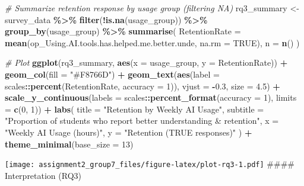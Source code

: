 \documentclass[
]{article}
\newenvironment{Shaded}{\begin{snugshade}}{\end{snugshade}}
\newcommand{\AttributeTok}[1]{\textcolor[rgb]{0.13,0.29,0.53}{#1}}
\newcommand{\CommentTok}[1]{\textcolor[rgb]{0.56,0.35,0.01}{\textit{#1}}}
\newcommand{\ConstantTok}[1]{\textcolor[rgb]{0.56,0.35,0.01}{#1}}
\newcommand{\DecValTok}[1]{\textcolor[rgb]{0.00,0.00,0.81}{#1}}
\newcommand{\FloatTok}[1]{\textcolor[rgb]{0.00,0.00,0.81}{#1}}
\newcommand{\FunctionTok}[1]{\textcolor[rgb]{0.13,0.29,0.53}{\textbf{#1}}}
\newcommand{\NormalTok}[1]{#1}
\newcommand{\OtherTok}[1]{\textcolor[rgb]{0.56,0.35,0.01}{#1}}
\newcommand{\SpecialCharTok}[1]{\textcolor[rgb]{0.81,0.36,0.00}{\textbf{#1}}}
\newcommand{\StringTok}[1]{\textcolor[rgb]{0.31,0.60,0.02}{#1}}
\begin{document}
\begin{Shaded}
\begin{Highlighting}[]
\CommentTok{\# Summarize retention response by usage group (filtering NA)}
\NormalTok{rq3\_summary }\OtherTok{\textless{}{-}}\NormalTok{ survey\_data }\SpecialCharTok{\%\textgreater{}\%}
  \FunctionTok{filter}\NormalTok{(}\SpecialCharTok{!}\FunctionTok{is.na}\NormalTok{(usage\_group)) }\SpecialCharTok{\%\textgreater{}\%}
  \FunctionTok{group\_by}\NormalTok{(usage\_group) }\SpecialCharTok{\%\textgreater{}\%}
  \FunctionTok{summarise}\NormalTok{(}
    \AttributeTok{RetentionRate =} \FunctionTok{mean}\NormalTok{(op\_Using.AI.tools.has.helped.me.better.unde, }\AttributeTok{na.rm =} \ConstantTok{TRUE}\NormalTok{),}
    \AttributeTok{n =} \FunctionTok{n}\NormalTok{()}
\NormalTok{  )}

\CommentTok{\# Plot}
\FunctionTok{ggplot}\NormalTok{(rq3\_summary, }\FunctionTok{aes}\NormalTok{(}\AttributeTok{x =}\NormalTok{ usage\_group, }\AttributeTok{y =}\NormalTok{ RetentionRate)) }\SpecialCharTok{+}
  \FunctionTok{geom\_col}\NormalTok{(}\AttributeTok{fill =} \StringTok{"\#F8766D"}\NormalTok{) }\SpecialCharTok{+}
  \FunctionTok{geom\_text}\NormalTok{(}\FunctionTok{aes}\NormalTok{(}\AttributeTok{label =}\NormalTok{ scales}\SpecialCharTok{::}\FunctionTok{percent}\NormalTok{(RetentionRate, }\AttributeTok{accuracy =} \DecValTok{1}\NormalTok{)), }\AttributeTok{vjust =} \SpecialCharTok{{-}}\FloatTok{0.3}\NormalTok{, }\AttributeTok{size =} \FloatTok{4.5}\NormalTok{) }\SpecialCharTok{+}
  \FunctionTok{scale\_y\_continuous}\NormalTok{(}\AttributeTok{labels =}\NormalTok{ scales}\SpecialCharTok{::}\FunctionTok{percent\_format}\NormalTok{(}\AttributeTok{accuracy =} \DecValTok{1}\NormalTok{), }\AttributeTok{limits =} \FunctionTok{c}\NormalTok{(}\DecValTok{0}\NormalTok{, }\DecValTok{1}\NormalTok{)) }\SpecialCharTok{+}
  \FunctionTok{labs}\NormalTok{(}
    \AttributeTok{title =} \StringTok{"Retention by Weekly AI Usage"}\NormalTok{,}
    \AttributeTok{subtitle =} \StringTok{"Proportion of students who report better understanding \& retention"}\NormalTok{,}
    \AttributeTok{x =} \StringTok{"Weekly AI Usage (hours)"}\NormalTok{,}
    \AttributeTok{y =} \StringTok{"Retention (TRUE responses)"}
\NormalTok{  ) }\SpecialCharTok{+}
  \FunctionTok{theme\_minimal}\NormalTok{(}\AttributeTok{base\_size =} \DecValTok{13}\NormalTok{)}
\end{Highlighting}
\end{Shaded}

\texttt{[image: assignment2\_group7\_files/figure-latex/plot-rq3-1.pdf]}
\#\#\#\# Interpretation (RQ3)
\end{document}
